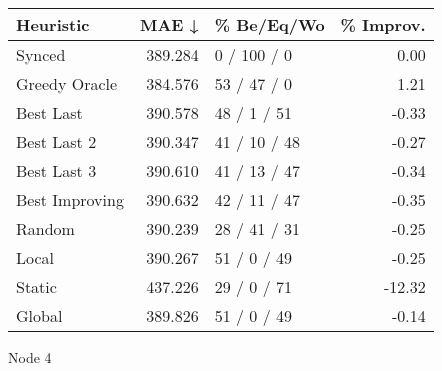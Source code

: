 \begin{tabular}{lrlr}
\toprule
\textbf{Heuristic} & \textbf{MAE ↓} & \textbf{\% Be/Eq/Wo} & \textbf{\% Improv.} \\
\midrule
            Synced &        389.284 &          0 / 100 / 0 &                0.00 \\
     Greedy Oracle &        384.576 &          53 / 47 / 0 &                1.21 \\
         Best Last &        390.578 &          48 / 1 / 51 &               -0.33 \\
       Best Last 2 &        390.347 &         41 / 10 / 48 &               -0.27 \\
       Best Last 3 &        390.610 &         41 / 13 / 47 &               -0.34 \\
    Best Improving &        390.632 &         42 / 11 / 47 &               -0.35 \\
            Random &        390.239 &         28 / 41 / 31 &               -0.25 \\
             Local &        390.267 &          51 / 0 / 49 &               -0.25 \\
            Static &        437.226 &          29 / 0 / 71 &              -12.32 \\
            Global &        389.826 &          51 / 0 / 49 &               -0.14 \\
\bottomrule
\end{tabular}
\caption{Node 4}
\label{tab:non_lr05_le1_bs2_4}
